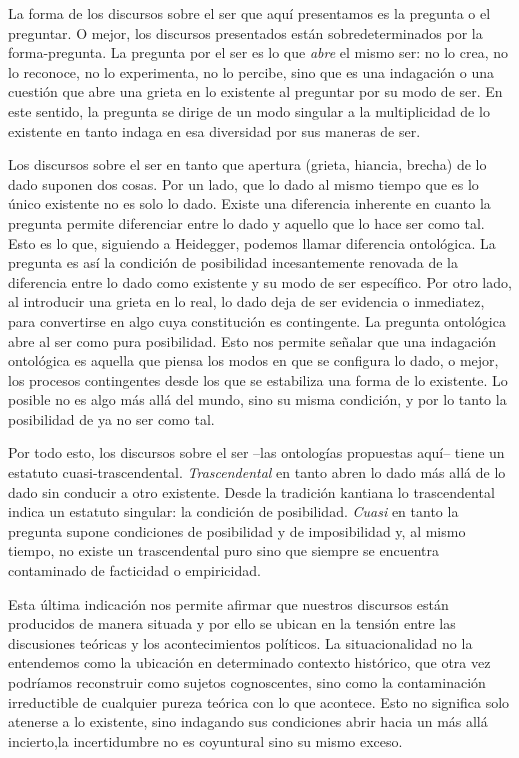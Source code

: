 La forma de los discursos sobre el ser que aquí presentamos es la
pregunta o el preguntar. O mejor, los discursos presentados están
sobredeterminados por la forma-pregunta. La pregunta por el ser es lo
que \emph{abre} el mismo ser: no lo crea, no lo reconoce, no lo
experimenta, no lo percibe, sino que es una indagación o una cuestión
que abre una grieta en lo existente al preguntar por su modo de ser. En
este sentido, la pregunta se dirige de un modo singular a la
multiplicidad de lo existente en tanto indaga en esa diversidad por sus
maneras de ser.

Los discursos sobre el ser en tanto que apertura (grieta, hiancia,
brecha) de lo dado suponen dos cosas. Por un lado, que lo dado al mismo
tiempo que es lo único existente no es solo lo dado. Existe una
diferencia inherente en cuanto la pregunta permite diferenciar entre lo
dado y aquello que lo hace ser como tal. Esto es lo que, siguiendo a
Heidegger, podemos llamar diferencia ontológica. La pregunta es así la
condición de posibilidad incesantemente renovada de la diferencia entre
lo dado como existente y su modo de ser específico. Por otro lado, al
introducir una grieta en lo real, lo dado deja de ser evidencia o
inmediatez, para convertirse en algo cuya constitución es contingente.
La pregunta ontológica abre al ser como pura posibilidad. Esto nos
permite señalar que una indagación ontológica es aquella que piensa los
modos en que se configura lo dado, o mejor, los procesos contingentes
desde los que se estabiliza una forma de lo existente. Lo posible no es
algo más allá del mundo, sino su misma condición, y por lo tanto la
posibilidad de ya no ser como tal.

Por todo esto, los discursos sobre el ser --las ontologías propuestas
aquí-- tiene un estatuto cuasi-trascendental. \emph{Trascendental} en
tanto abren lo dado más allá de lo dado sin conducir a otro existente.
Desde la tradición kantiana lo trascendental indica un estatuto
singular: la condición de posibilidad. \emph{Cuasi} en tanto la pregunta
supone condiciones de posibilidad y de imposibilidad y, al mismo tiempo,
no existe un trascendental puro sino que siempre se encuentra
contaminado de facticidad o empiricidad.

Esta última indicación nos permite afirmar que nuestros discursos están
producidos de manera situada y por ello se ubican en la tensión entre
las discusiones teóricas y los acontecimientos políticos. La
situacionalidad no la entendemos como la ubicación en determinado
contexto histórico, que otra vez podríamos reconstruir como sujetos
cognoscentes, sino como la contaminación irreductible de cualquier
pureza teórica con lo que acontece. Esto no significa solo atenerse a lo
existente, sino indagando sus condiciones abrir hacia un más allá
incierto,la incertidumbre no es coyuntural sino su mismo exceso.

